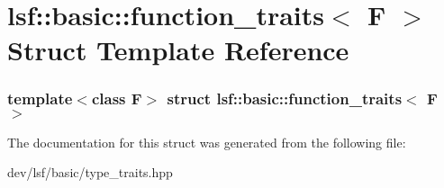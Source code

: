 \hypertarget{structlsf_1_1basic_1_1function__traits}{
\section{lsf::basic::function\_\-traits$<$ F $>$ Struct Template Reference}
\label{structlsf_1_1basic_1_1function__traits}
}
\subsubsection*{template$<$class F$>$ struct lsf::basic::function\_\-traits$<$ F $>$}



The documentation for this struct was generated from the following file:\begin{DoxyCompactItemize}
\item 
dev/lsf/basic/type\_\-traits.hpp\end{DoxyCompactItemize}
